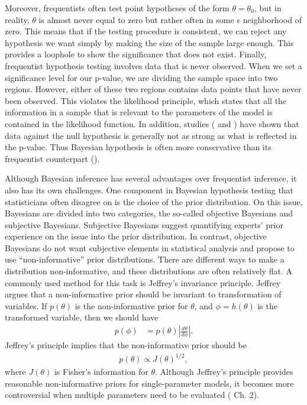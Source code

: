 \documentclass[12pt]{article} \usepackage[nolists]{endfloat}
\begin{document}
Moreover, frequentists often test point hypotheses of the form
$\theta = \theta_0$, but in reality, $\theta$ is almost never equal to
zero but rather often in some $\epsilon$ neighborhood of zero.  This
means that if the testing procedure is consistent, we can reject any
hypothesis we want simply by making the size of the sample large enough.  This provides a loophole to show the significance
that does not exist.  Finally, frequentist hypothesis testing involves
data that is never observed.  When we set a significance level for our
p-value, we are dividing the sample space into two regions.  However,
either of these two regions contains data points that have never been
observed.  This violates the likelihood principle, which states that
all the information in a sample that is relevant to the parameters of
the model is contained in the likelihood function. In addition,
studies (\cite{bergerSelke} and \cite{casellaBerger}) have shown that
data against the null hypothesis is generally not as strong as what is
reflected in the p-value. Thus Bayesian hypothesis is often more
conservative than its frequentist counterpart (\cite{press}).

Although Bayesian inference has several advantages over frequentist
inference, it also has its own challenges.  One component in Bayesian
hypothesis testing that statisticians often disagree on is the choice
of the prior distribution.
On this issue, Bayesians are divided into two categories, the so-called objective Bayesians and subjective Bayesians.
Subjective Bayesians suggest quantifying experts' prior experience on the issue into the prior distribution.
In contrast, objective Bayesians do not want subjective elements in statistical analysis and propose to use ``non-informative'' prior distributions.
There are different ways to make a distribution non-informative, and these distributions are often relatively flat.
A commonly used method for this task is Jeffrey's invariance principle.
Jeffrey argues that a non-informative prior should be invariant to transformation of variables.
If $p(\theta)$ is the non-informative prior for $\theta$,
and $\phi = h(\theta)$ is the transformed variable,
then we should have
\begin{align*}
  p(\phi) & = p(\theta) \left|\frac{d\theta}{d\phi}\right|.
\end{align*}
Jeffrey's principle implies that the non-informative prior should be
\begin{align*}
  p(\theta) \propto J(\theta)^{1/2},
\end{align*}
where $J(\theta)$ is Fisher's information for $\theta$.
Although Jeffrey's principle provides reasonable non-informative priors for single-parameter models,
it becomes more controversial when multiple parameters need to be evaluated (\cite{gelman} Ch. 2).
\end{document}

